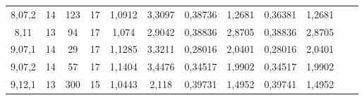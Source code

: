 \begin{table}[h]
\begin{tabular}{cccc|c|c|c|c|c|c|ll}
\multicolumn{1}{|c|}{8,07,2}  & \multicolumn{1}{c|}{14}         & \multicolumn{1}{c|}{123}    & 17      & 1,0912                                                  & 3,3097                                              & 0,38736                                                 & 1,2681
& 0,36381                                                 & 1,2681                                              &  &  \\ \cline{1-10}
\multicolumn{1}{|c|}{8,11}    & \multicolumn{1}{c|}{13}         & \multicolumn{1}{c|}{94}     & 17      & 1,074                                                   & 2,9042                                              & 0,38836                                                 & 2,8705                                              & 0,38836                                                 & 2,8705                                              &  &  \\ \cline{1-10}
\multicolumn{1}{|c|}{9,07,1}  & \multicolumn{1}{c|}{14}         & \multicolumn{1}{c|}{29}     & 17      & 1,1285                                                  & 3,3211                                              & 0,28016                                                 & 2,0401                                              & 0,28016                                                 & 2,0401                                              &  &  \\ \cline{1-10}
\multicolumn{1}{|c|}{9,07,2}  & \multicolumn{1}{c|}{14}         & \multicolumn{1}{c|}{57}     & 17      & 1,1404                                                  & 3,4476                                              & 0,34517                                                 & 1,9902                                              & 0,34517                                                 & 1,9902                                              &  &  \\ \cline{1-10}
\multicolumn{1}{|c|}{9,12,1}  & \multicolumn{1}{c|}{13}         & \multicolumn{1}{c|}{300}    & 15      & 1,0443                                                  & 2,118                                               & 0,39731                                                 & 1,4952                                              & 0,39741                                                 & 1,4952                                              &  &  \\ \cline{1-10}
\end{tabular}
\end{table}

